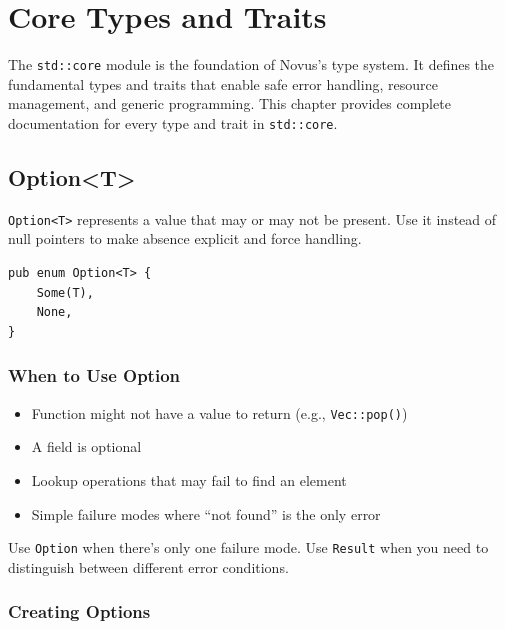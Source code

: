 \chapter{Core Types and Traits}
\label{ch:core-types}

The \texttt{std::core} module is the foundation of Novus's type system. It defines the fundamental types and traits that enable safe error handling, resource management, and generic programming. This chapter provides complete documentation for every type and trait in \texttt{std::core}.

\section{Option\textless T\textgreater}
\label{sec:option}

\texttt{Option<T>} represents a value that may or may not be present. Use it instead of null pointers to make absence explicit and force handling.

\begin{lstlisting}
pub enum Option<T> {
    Some(T),
    None,
}
\end{lstlisting}

\subsection{When to Use Option}

\begin{itemize}
    \item Function might not have a value to return (e.g., \texttt{Vec::pop()})
    \item A field is optional
    \item Lookup operations that may fail to find an element
    \item Simple failure modes where ``not found'' is the only error
\end{itemize}

\begin{notebox}
Use \texttt{Option} when there's only one failure mode. Use \texttt{Result} when you need to distinguish between different error conditions.
\end{notebox}

\subsection{Creating Options}

